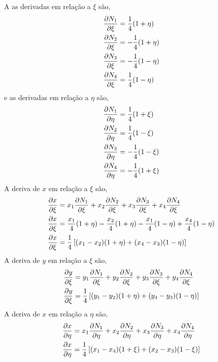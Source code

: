 %
A as derivadas em relação a $\xi$ são,
\begin{equation}
	\begin{split}
		&\frac{\partial N_1}{\partial \xi} = \frac{1}{4}(1 + \eta)\\
		&\frac{\partial N_2}{\partial \xi} =-\frac{1}{4}(1 + \eta)\\
		&\frac{\partial N_3}{\partial \xi} =-\frac{1}{4}(1 - \eta)\\
		&\frac{\partial N_4}{\partial \xi} = \frac{1}{4}(1 - \eta)\\
	\end{split}
\end{equation}
%
e as derivadas em relação a $\eta$ são,
\begin{equation}
	\begin{split}
		&\frac{\partial N_1}{\partial \eta} = \frac{1}{4}(1 + \xi)\\
		&\frac{\partial N_2}{\partial \eta} = \frac{1}{4}(1 - \xi)\\
		&\frac{\partial N_3}{\partial \eta} =-\frac{1}{4}(1 - \xi)\\
		&\frac{\partial N_4}{\partial \eta} =-\frac{1}{4}(1 + \xi)\\
	\end{split}
\end{equation}
%
A deriva de $x$ em relação a  $\xi$ são,
%
\begin{equation}
	\begin{split}
&	\frac{\partial x}{\partial \xi} = x_1 \frac{\partial N_1}{\partial \xi} + x_2 \frac{\partial N_2}{\partial \xi} + x_3 \frac{\partial N_3}{\partial \xi} + x_4 \frac{\partial N_4}{\partial \xi}\\
&   \frac{\partial x}{\partial \xi} = \frac{x_1}{4} (1 + \eta) - \frac{x_2}{4} (1 + \eta) - \frac{x_1}{4} (1 - \eta) + \frac{x_4}{4} (1 - \eta)\\
&   \frac{\partial x}{\partial \xi} = \frac{1}{4}\left[ (x_1 - x_2)(1 + \eta) + (x_4 - x_3)(1 - \eta) \right]
	\end{split}
\end{equation}
%
A deriva de $y$ em relação a  $\xi$ são,
%
\begin{equation}
	\begin{split}
		&	\frac{\partial y}{\partial \xi} = y_1 \frac{\partial N_1}{\partial \xi} + y_2 \frac{\partial N_2}{\partial \xi} + y_3 \frac{\partial N_3}{\partial \xi} + y_4 \frac{\partial N_4}{\partial \xi}\\
		&   \frac{\partial y}{\partial \xi} = \frac{1}{4}\left[ (y_1 - y_2)(1 + \eta) + (y_4 - y_3)(1 - \eta) \right]
	\end{split}
\end{equation}
%
A deriva de $x$ em relação a  $\eta$ são,
%
\begin{equation}
	\begin{split}
		&	\frac{\partial x}{\partial \eta} = x_1 \frac{\partial N_1}{\partial \eta} + x_2 \frac{\partial N_2}{\partial \eta} + x_3 \frac{\partial N_3}{\partial \eta} + x_4 \frac{\partial N_4}{\partial \eta}\\
		&   \frac{\partial x}{\partial \eta} = \frac{1}{4}\left[ (x_1 - x_4)(1 + \xi) + (x_2 - x_3)(1 - \xi) \right]
	\end{split}
\end{equation}
